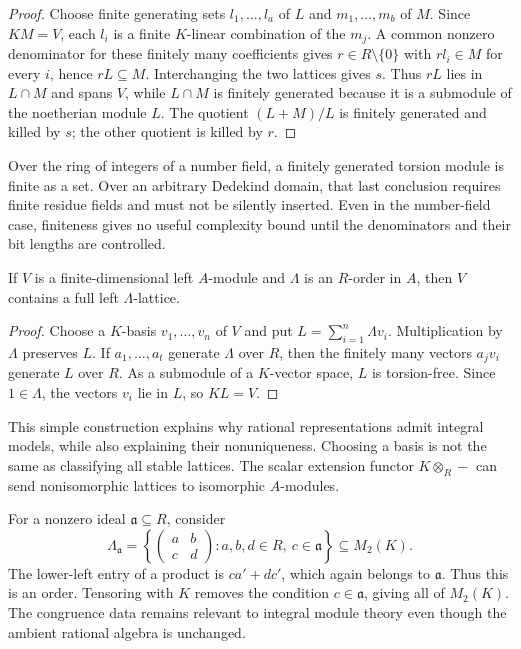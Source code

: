 \begin{proof}
Choose finite generating sets $l_1,\ldots,l_a$ of $L$ and
$m_1,\ldots,m_b$ of $M$. Since $KM=V$, each $l_i$ is a finite
$K$-linear combination of the $m_j$. A common nonzero denominator
for these finitely many coefficients gives $r\in R\setminus\{0\}$
with $r l_i\in M$ for every $i$, hence $rL\subseteq M$.
Interchanging the two lattices gives $s$. Thus $rL$ lies in
$L\cap M$ and spans $V$, while $L\cap M$ is finitely generated
because it is a submodule of the noetherian module $L$. The quotient
$(L+M)/L$ is finitely generated and killed by $s$; the other quotient
is killed by $r$.
\end{proof}

Over the ring of integers of a number field, a finitely generated
torsion module is finite as a set. Over an arbitrary Dedekind domain,
that last conclusion requires finite residue fields and must not be
silently inserted. Even in the number-field case, finiteness gives no
useful complexity bound until the denominators and their bit lengths
are controlled.

\begin{proposition}
\label{prop:stable-model}
If $V$ is a finite-dimensional left $A$-module and $\Lambda$ is an
$R$-order in $A$, then $V$ contains a full left $\Lambda$-lattice.
\end{proposition}

\begin{proof}
Choose a $K$-basis $v_1,\ldots,v_n$ of $V$ and put
$L=\sum_{i=1}^n\Lambda v_i$. Multiplication by $\Lambda$ preserves
$L$. If $a_1,\ldots,a_t$ generate $\Lambda$ over $R$, then the
finitely many vectors $a_jv_i$ generate $L$ over $R$. As a submodule
of a $K$-vector space, $L$ is torsion-free. Since $1\in\Lambda$,
the vectors $v_i$ lie in $L$, so $KL=V$.
\end{proof}

This simple construction explains why rational representations admit
integral models, while also explaining their nonuniqueness. Choosing a
basis is not the same as classifying all stable lattices. The scalar
extension functor $K\otimes_R-$ can send nonisomorphic lattices to
isomorphic $A$-modules.

\begin{example}
For a nonzero ideal $\mathfrak a\subseteq R$, consider
\[
 \Lambda_{\mathfrak a}=
 \left\{\begin{pmatrix}a&b\\c&d\end{pmatrix}:
 a,b,d\in R,\ c\in\mathfrak a\right\}\subseteq M_2(K).
\]
The lower-left entry of a product is $ca'+dc'$, which again belongs
to $\mathfrak a$. Thus this is an order. Tensoring with $K$ removes
the condition $c\in\mathfrak a$, giving all of $M_2(K)$. The
congruence data remains relevant to integral module theory even
though the ambient rational algebra is unchanged.
\end{example}

